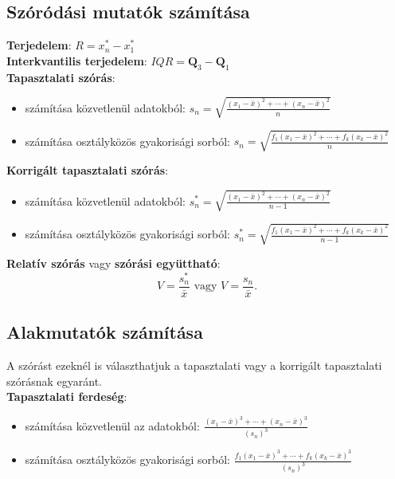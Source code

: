 \documentclass[12pt]{article}
\begin{document}
    \subsection{Szóródási mutatók számítása}
    \textbf{Terjedelem}: $R = x_n^* - x_1^*$\\
    \textbf{Interkvantilis terjedelem}: $IQR = \mathbf{Q}_3 - \mathbf{Q}_1$\\
    \textbf{Tapasztalati szórás}:
    \begin{itemize}
        \item számítása közvetlenül adatokból: $\displaystyle s_n = \sqrt{\frac{(x_1 - \bar{x})^2 + \cdots + (x_n - \bar{x})^2}{n}}$
        \item számítása osztályközös gyakorisági sorból: $\displaystyle s_n = \sqrt{\frac{f_1(x_1 - \bar{x})^2 + \cdots + f_k(x_k - \bar{x})^2}{n}}$
    \end{itemize}

    \textbf{Korrigált tapasztalati szórás}:
    \begin{itemize}
        \item számítása közvetlenül adatokból: $\displaystyle s_n^* = \sqrt{\frac{(x_1 - \bar{x})^2 + \cdots + (x_n - \bar{x})^2}{n-1}}$
        \item számítása osztályközös gyakorisági sorból: $\displaystyle s_n^* = \sqrt{\frac{f_1(x_1 - \bar{x})^2 + \cdots + f_k(x_k - \bar{x})^2}{n-1}}$
    \end{itemize}

    \textbf{Relatív szórás} vagy \textbf{szórási együttható}:
    \[
        V = \frac{s_n^*}{\bar{x}} \text{ vagy } V = \frac{s_n}{\bar{x}}.
    \]

    \subsection{Alakmutatók számítása}
    A szórást ezeknél is választhatjuk a tapasztalati vagy a korrigált tapasztalati szórásnak egyaránt.\\

    \textbf{Tapasztalati ferdeség}:
    \begin{itemize}
        \item számítása közvetlenül az adatokból: $\displaystyle \frac{(x_1 - \bar{x})^3 + \cdots + (x_n - \bar{x})^3}{(s_n)^3}$
        \item számítása osztályközös gyakorisági sorból: $\displaystyle \frac{f_1(x_1 - \bar{x})^3 + \cdots + f_k(x_k - \bar{x})^3}{(s_n)^3}$
    \end{itemize}
\end{document}
